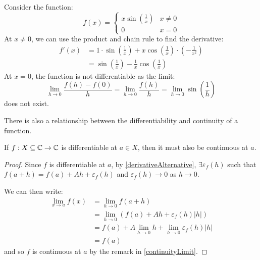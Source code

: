\documentclass[../main.tex]{subfiles}
\begin{document}
\begin{example}
  Consider the function:
  \[
    f(x) = \begin{cases}
    x \sin\left(\frac{1}{x}\right) & x \neq 0 \\
    0 & x =0
    \end{cases}
  \]
  At $x \neq 0$, we can use the product and chain rule to find the derivative:
  \begin{align*}
    f'(x) &= 1 \cdot \sin\left(\frac{1}{x}\right) + x \cos \left(\frac{1}{x}\right) \cdot\left(-\frac{1}{x^2}\right) \\
          &= \sin\left(\frac{1}{x}\right) - \frac{1}{x} \cos\left(\frac{1}{x}\right)
  \end{align*}
  At $x = 0$, the function is not differentiable as the limit:
  \[
    \lim_{h \to 0} \frac{f(h) - f(0)}{h} = \lim_{h \to 0} \frac{f(h)}{h} = \lim_{h \to 0} \sin\left(\frac{1}{h}\right)
  \]
  does not exist.
\end{example}
There is also a relationship between the differentiability and continuity of a function.
\begin{lemma}
  If $f: X \subseteq \mathbb{C} \to \mathbb{C}$ is differentiable at $a \in X$, then it must also be continuous at $a$.
  \label{diffCont}
\end{lemma}
\begin{proof}
  Since $f$ is differentiable at $a$, by \cref{derivativeAlternative}, $\exists \varepsilon_f(h)$ such that $f(a + h) = f(a) + Ah + \varepsilon_f(h)$ and $\varepsilon_f(h) \to 0$ as $h \to 0$.

  We can then write:
  \begin{align*}
    \lim_{x \to a} f(x) &= \lim_{h \to 0} f(a + h) \\
                        &= \lim_{h \to 0} (f(a) + Ah + \varepsilon_f(h)|h|) \\
                        &= f(a) + A \lim_{h \to 0} h + \lim_{h \to 0} \varepsilon_f(h)|h| \\
                        &= f(a)
  \end{align*}
  and so $f$ is continuous at $a$ by the remark in \cref{continuityLimit}.
\end{proof}
\end{document}
